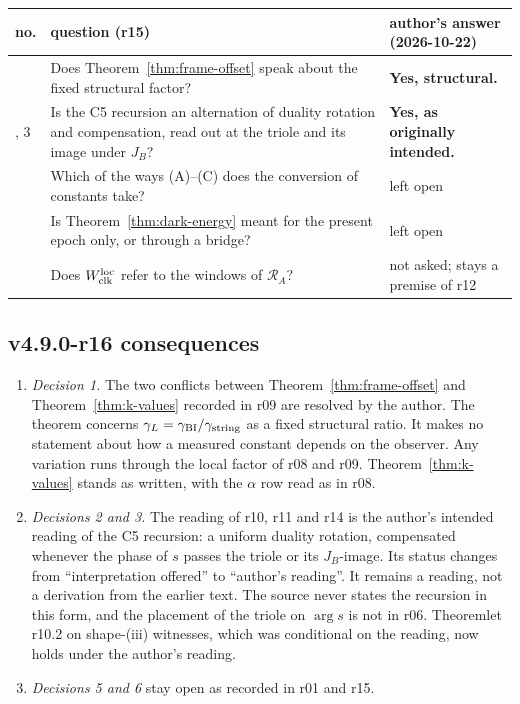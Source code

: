 \begin{center}
\small
\begin{tabular}{@{}>{\raggedright\arraybackslash}p{}>{\raggedright\arraybackslash}p{}>{\raggedright\arraybackslash}p{}@{}}
\toprule
no. & question (r15) & author's answer (2026-10-22)\\
\midrule
1 & Does Theorem~\ref{thm:frame-offset} speak about the fixed structural factor? & \textbf{Yes, structural.}\\
2, 3 & Is the C5 recursion an alternation of duality rotation and compensation, read out at the triole and its image under \(J_B\)? & \textbf{Yes, as originally intended.}\\
5 & Which of the ways (A)--(C) does the conversion of constants take? & left open\\
6 & Is Theorem~\ref{thm:dark-energy} meant for the present epoch only, or through a bridge? & left open\\
4 & Does \(W_{\rm clk}^{\rm loc}\) refer to the windows of \(\mathcal R_A\)? & not asked; stays a premise of r12\\
\bottomrule
\end{tabular}
\end{center}

\subsection*{v4.9.0-r16 consequences}
\label{subsec:v490-r16-consequences}

\begin{enumerate}[leftmargin=2em]
\item \emph{Decision 1.}  The two conflicts between Theorem~\ref{thm:frame-offset} and Theorem~\ref{thm:k-values} recorded in
r09 are resolved by the author.  The theorem concerns \(\gamma_L=\gamma_{\mathrm{BI}}/\gamma_{\mathrm{string}}\) as a fixed structural ratio.  It makes no
statement about how a measured constant depends on the observer.  Any variation runs through the local factor of r08 and
r09.  Theorem~\ref{thm:k-values} stands as written, with the \(\alpha\) row read as in r08.
\item \emph{Decisions 2 and 3.}  The reading of r10, r11 and r14 is the author's intended reading of the C5 recursion: a
uniform duality rotation, compensated whenever the phase of \(s\) passes the triole or its \(J_B\)-image.  Its status changes
from ``interpretation offered'' to ``author's reading''.  It remains a reading, not a derivation from the earlier text.
The source never states the recursion in this form, and the placement of the triole on \(\arg s\) is not in r06.
Theoremlet r10.2 on shape-(iii) witnesses, which was conditional on the reading, now holds under the author's reading.
\item \emph{Decisions 5 and 6} stay open as recorded in r01 and r15.
\end{enumerate}

